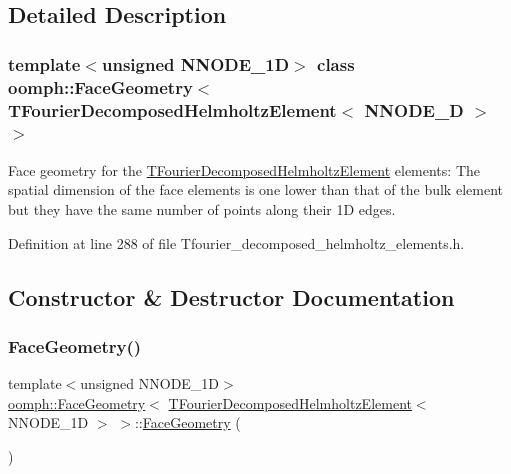 \subsection{Detailed Description}
\subsubsection*{template$<$unsigned N\+N\+O\+D\+E\+\_\+1D$>$\newline
class oomph\+::\+Face\+Geometry$<$ T\+Fourier\+Decomposed\+Helmholtz\+Element$<$ N\+N\+O\+D\+E\+\_\+D $>$ $>$}

Face geometry for the \hyperlink{classoomph_1_1TFourierDecomposedHelmholtzElement}{T\+Fourier\+Decomposed\+Helmholtz\+Element} elements\+: The spatial dimension of the face elements is one lower than that of the bulk element but they have the same number of points along their 1D edges. 

Definition at line 288 of file Tfourier\+\_\+decomposed\+\_\+helmholtz\+\_\+elements.\+h.



\subsection{Constructor \& Destructor Documentation}
\mbox{\label{classoomph_1_1FaceGeometry_3_01TFourierDecomposedHelmholtzElement_3_01NNODE__1D_01_4_01_4_a9861ed10cee3b5646a3efbcc021f44e2}} 
\subsubsection{\texorpdfstring{Face\+Geometry()}{FaceGeometry()}}
{\footnotesize\ttfamily template$<$unsigned N\+N\+O\+D\+E\+\_\+1D$>$ \\
\hyperlink{classoomph_1_1FaceGeometry}{oomph\+::\+Face\+Geometry}$<$ \hyperlink{classoomph_1_1TFourierDecomposedHelmholtzElement}{T\+Fourier\+Decomposed\+Helmholtz\+Element}$<$ N\+N\+O\+D\+E\+\_\+1D $>$ $>$\+::\hyperlink{classoomph_1_1FaceGeometry}{Face\+Geometry} (\begin{DoxyParamCaption}{ }\end{DoxyParamCaption})\hspace{0.3cm}{\ttfamily [inline]}}



